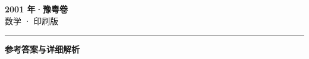 \documentclass[zihao=5, a4paper]{ctexart}
\begin{document}
\begin{center}
  {\Large\bfseries 2001 年·豫粤卷}\\[4pt]
  {\large 数学 · 印刷版}
\end{center}
\medskip
{}

\par\bigskip\hrule\bigskip
{}
\begin{center}{\large\bfseries 参考答案与详细解析}\end{center}
\smallskip

\end{document}

